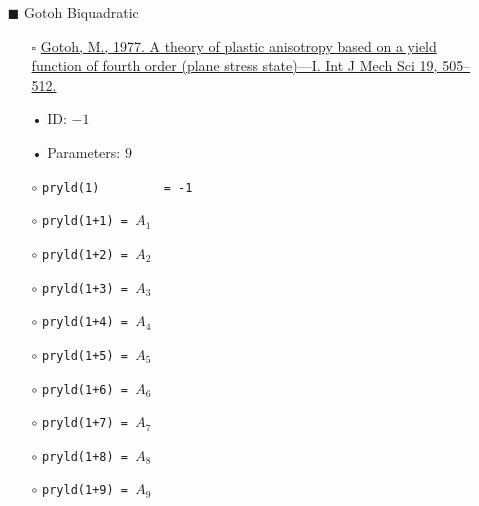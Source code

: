 \documentclass[11pt,a4paper,twoside,final,onecolumn,titlepage]{article}
\begin{document}
\newpage
\begin{itemize}
	\item[\tiny$\blacksquare$] Gotoh Biquadratic
	\begin{itemize}
		\item[\tiny$\square$] {\small \href{https://doi.org/10.1016/0020-7403(77)90043-1}{Gotoh, M., 1977. A theory of plastic anisotropy based on a yield function of fourth order (plane stress state)—I. Int J Mech Sci 19, 505–512.}}\\
		\item[•] ID: $-1$
		\item[•] Parameters: $9$\\
		\item[$\circ$] \texttt{pryld(1)\,\,\,\,\,\,\,\,\,= -1}
		\item[$\circ$] \texttt{pryld(1+1) = $A_1$}
		\item[$\circ$] \texttt{pryld(1+2) = $A_2$}
		\item[$\circ$] \texttt{pryld(1+3) = $A_3$}
		\item[$\circ$] \texttt{pryld(1+4) = $A_4$}
		\item[$\circ$] \texttt{pryld(1+5) = $A_5$}
		\item[$\circ$] \texttt{pryld(1+6) = $A_6$}
		\item[$\circ$] \texttt{pryld(1+7) = $A_7$}
		\item[$\circ$] \texttt{pryld(1+8) = $A_8$}
		\item[$\circ$] \texttt{pryld(1+9) = $A_9$}\\
	\end{itemize}
\end{itemize}
\end{document}
